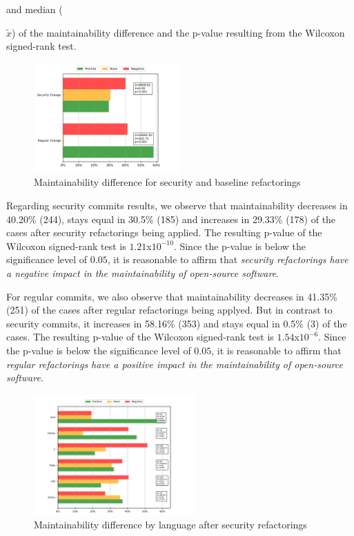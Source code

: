 \documentclass[10pt,conference]{IEEEtran}
\begin{document}
and median ({$\widetilde{x}$) of the maintainability difference and the p-value
resulting from the Wilcoxon signed-rank test.

\begin{figure}[h]
 	\centering 	\includegraphics[width=0.5\textwidth]{figures/maintainability.pdf}
 	\caption{Maintainability difference for security and baseline refactorings}
	\label{fig:secvsreg}
\end{figure}

Regarding security commits results, we observe that maintainability decreases
in 40.20\% (244), stays equal in 30.5\% (185) and increases in 29.33\% (178)
of the cases after security refactorings being applied. The resulting p-value
of the Wilcoxon signed-rank test is $1.21$x$10^{-10}$. Since the p-value is below
the significance level of $0.05$, it is reasonable to affirm that \emph{security
refactorings have a negative impact in the maintainability of open-source software}.

For regular commits, we also observe that maintainability decreases in 41.35\%
(251) of the cases after regular refactorings being applyed. But in contrast
to security commits, it increases in 58.16\% (353) and stays equal in 0.5\%
(3) of the cases. The resulting p-value of the Wilcoxon signed-rank test is
$1.54$x$10^{-6}$. Since the p-value is below the significance level of $0.05$,
it is reasonable to affirm that \emph{regular refactorings have a positive
impact in the maintainability of open-source software}.

\begin{figure}[h]
 	\centering
 	\includegraphics[width=0.55\textwidth]{figures/language.pdf}
 	\caption{Maintainability difference by language after security refactorings}
	\label{fig:lang_main}
\end{figure}

}
\end{document}

